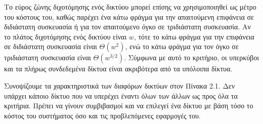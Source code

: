 \documentclass[12pt,a4paper]{article}
\begin{document}
Το εύρος ζώνης διχοτόμησης ενός δικτύου μπορεί επίσης να χρησιμοποιηθεί ως 
μέτρο του κόστους του, καθώς παρέχει ένα κάτω φράγμα για την απαιτούμενη 
επιφάνεια σε διδιάστατη συσκευασία ή για τον απαιτούμενο όγκο σε 
τριδιάστατη συσκευασία. Αν το πλάτος διχοτόμησης ενός δικτύου είναι $w$, 
τότε το κάτω φράγμα για την επιφάνεια σε διδιάστατη συσκευασία είναι 
$\Theta(w^2)$, ενώ το κάτω φράγμα για τον όγκο σε τριδιάστατη συσκευασία 
είναι $\Theta(w^{3/2})$. Σύμφωνα με αυτό το κριτήριο, οι υπερκύβοι και τα 
πλήρως συνδεδεμένα δίκτυα είναι ακριβότερα από τα υπόλοιπα δίκτυα.

Συνοψίζουμε τα χαρακτηριστικά των διαφόρων δικτύων στον Πίνακα 2.1.
Δεν υπάρχει κάποιο δίκτυο που να υπερέχει έναντι όλων των άλλων ως προς 
όλα τα κριτήρια. Πρέπει να γίνουν συμβιβασμοί και να επιλεγεί ένα δίκτυο 
με βάση τόσο το κόστος του συστήματος όσο και τις προβλεπόμενες εφαρμογές 
του.

\begin{table}[H]
\centering
\caption{Σύνοψη των χαρακτηριστικών διαφόρων τοπολογιών στατικών δικτύων
που συνδέουν $p$ επεξεργαστές.}
\label{tab:topologies}
\end{table}
\end{document}

